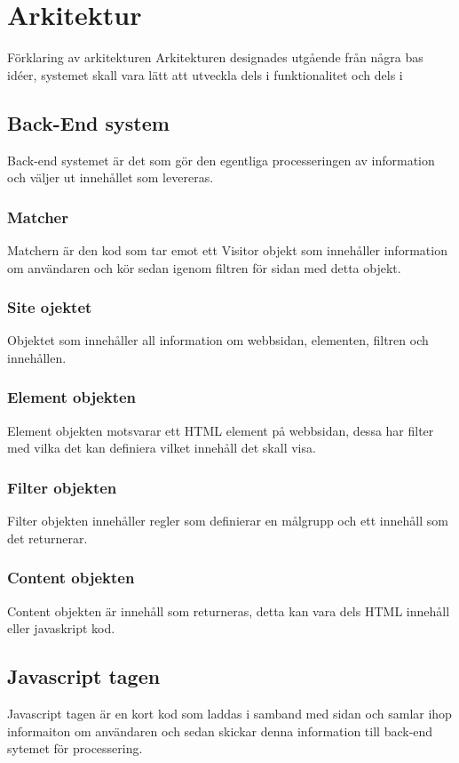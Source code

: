 \section{Arkitektur}

Förklaring av arkitekturen
Arkitekturen designades utgående från några bas idéer, systemet skall vara lätt att utveckla dels i funktionalitet och dels i 

\subsection{Back-End system}

Back-end systemet är det som gör den egentliga processeringen av information och väljer ut innehållet som levereras.

\subsubsection{Matcher}

Matchern är den kod som tar emot ett Visitor objekt som innehåller information om användaren och kör sedan igenom filtren för sidan med detta objekt.

\subsubsection{Site ojektet}

Objektet som innehåller all information om webbsidan, elementen, filtren och innehållen.

\subsubsection{Element objekten}

Element objekten motsvarar ett HTML element på webbsidan, dessa har filter med vilka det kan definiera vilket innehåll det skall visa.

\subsubsection{Filter objekten}

Filter objekten innehåller regler som definierar en målgrupp och ett innehåll som det returnerar.

\subsubsection{Content objekten}

Content objekten är innehåll som returneras, detta kan vara dels HTML innehåll eller javaskript kod.

\subsection{Javascript tagen}

Javascript tagen är en kort kod som laddas i samband med sidan och samlar ihop informaiton om användaren och sedan skickar denna information till back-end sytemet för processering.


